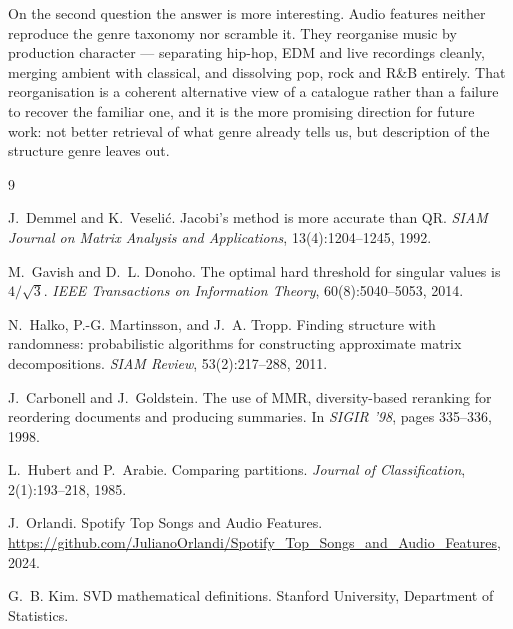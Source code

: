 \documentclass[11pt]{article}
\begin{document}
On the second question the answer is more interesting. Audio features neither
reproduce the genre taxonomy nor scramble it. They reorganise music by
production character --- separating hip-hop, EDM and live recordings cleanly,
merging ambient with classical, and dissolving pop, rock and R\&B entirely.
That reorganisation is a coherent alternative view of a catalogue rather than a
failure to recover the familiar one, and it is the more promising direction for
future work: not better retrieval of what genre already tells us, but
description of the structure genre leaves out.

\begin{thebibliography}{9}
\small

J.~Demmel and K.~Veseli\'{c}.
\newblock Jacobi's method is more accurate than QR.
\newblock \emph{SIAM Journal on Matrix Analysis and Applications},
  13(4):1204--1245, 1992.

M.~Gavish and D.~L. Donoho.
\newblock The optimal hard threshold for singular values is $4/\sqrt{3}$.
\newblock \emph{IEEE Transactions on Information Theory}, 60(8):5040--5053, 2014.

N.~Halko, P.-G. Martinsson, and J.~A. Tropp.
\newblock Finding structure with randomness: probabilistic algorithms for
  constructing approximate matrix decompositions.
\newblock \emph{SIAM Review}, 53(2):217--288, 2011.

J.~Carbonell and J.~Goldstein.
\newblock The use of MMR, diversity-based reranking for reordering documents
  and producing summaries.
\newblock In \emph{SIGIR '98}, pages 335--336, 1998.

L.~Hubert and P.~Arabie.
\newblock Comparing partitions.
\newblock \emph{Journal of Classification}, 2(1):193--218, 1985.

J.~Orlandi.
\newblock Spotify Top Songs and Audio Features.
\newblock \url{https://github.com/JulianoOrlandi/Spotify_Top_Songs_and_Audio_Features}, 2024.

G.~B. Kim.
\newblock SVD mathematical definitions.
\newblock Stanford University, Department of Statistics.

\end{thebibliography}
\end{document}
